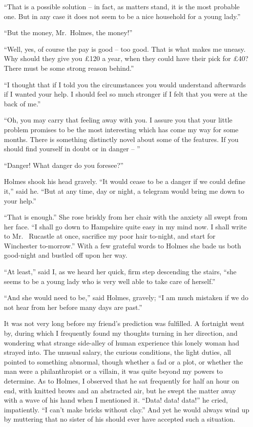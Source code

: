 “That is a possible solution -- in fact, as matters stand, it is
the most probable one. But in any case it does not seem to
be a nice household for a young lady.”

“But the money, Mr.~Holmes, the money!”

“Well, yes, of course the pay is good -- too good. That is
what makes me uneasy. Why should they give you £120 a
year, when they could have their pick for £40? There must
be some strong reason behind.”

“I thought that if I told you the circumstances you would
understand afterwards if I wanted your help. I should feel so
much stronger if I felt that you were at the back of me.”

“Oh, you may carry that feeling away with you. I assure
you that your little problem promises to be the most interesting
which has come my way for some months. There is
something distinctly novel about some of the features. If
you should find yourself in doubt or in danger -- ”

“Danger! What danger do you foresee?”

Holmes shook his head gravely. “It would cease to be a
danger if we could define it,” said he. “But at any time, day
or night, a telegram would bring me down to your help.”

“That is enough.” She rose briskly from her chair with
the anxiety all swept from her face. “I shall go down to
Hampshire quite easy in my mind now. I shall write to Mr.\ %
Rucastle at once, sacrifice my poor hair to-night, and start
for Winchester to-morrow.” With a few grateful words to
Holmes she bade us both good-night and bustled off upon
her way.

“At least,” said I, as we heard her quick, firm step descending
the stairs, “she seems to be a young lady who is very well
able to take care of herself.”

“And she would need to be,” said Holmes, gravely; “I am
much mistaken if we do not hear from her before many days
are past.”

It was not very long before my friend’s prediction was fulfilled.
A fortnight went by, during which I frequently found
my thoughts turning in her direction, and wondering what
strange side-alley of human experience this lonely woman had
strayed into. The unusual salary, the curious conditions, the
light duties, all pointed to something abnormal, though whether
a fad or a plot, or whether the man were a philanthropist or a
villain, it was quite beyond my powers to determine. As to
Holmes, I observed that he sat frequently for half an hour on
end, with knitted brows and an abstracted air, but he swept
the matter away with a wave of his hand when I mentioned it.
“Data! data! data!” he cried, impatiently. “I can’t make
bricks without clay.” And yet he would always wind up by
muttering that no sister of his should ever have accepted such
a situation.

